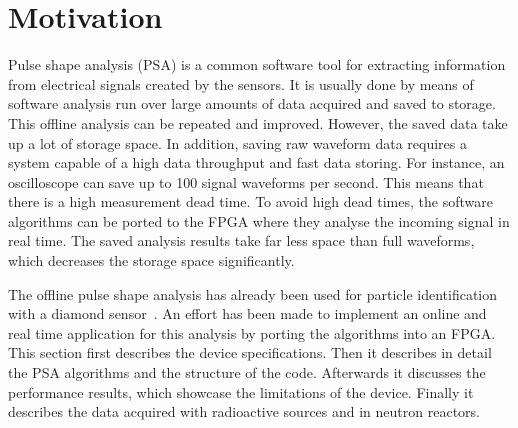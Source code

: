 

\section{Motivation}
\label{sec:rtpi}
Pulse shape analysis (PSA) is a common software tool for extracting information from electrical signals created by the sensors. It is usually done by means of software analysis run over large amounts of data acquired and saved to storage. This offline analysis can be repeated and improved. However, the saved data take up a lot of storage space. In addition, saving raw waveform data requires a system capable of a high data throughput and fast data storing. For instance, an oscilloscope can save up to 100 signal waveforms per second. This means that there is a high measurement dead time. To avoid high dead times, the software algorithms can be ported to the FPGA where they analyse the incoming signal in real time. The saved analysis results take far less space than full waveforms, which decreases the storage space significantly.

The offline pulse shape analysis has already been used for particle identification with a diamond sensor~\cite{PAVEL:00000, PAVEL:00002}. An effort has been made to implement an online and real time application for this analysis by porting the algorithms into an FPGA. This section first describes the device specifications. Then it describes in detail the PSA algorithms and the structure of the code. Afterwards it discusses the performance results, which showcase the limitations of the device. Finally it describes the data acquired with radioactive sources and in neutron reactors.

